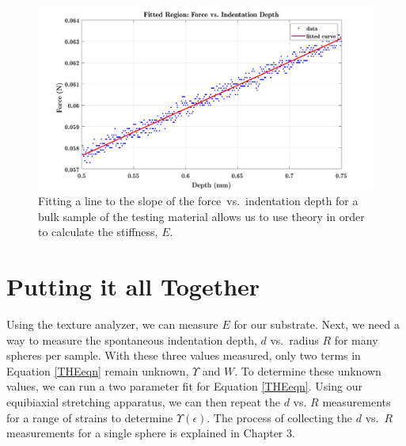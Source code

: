 \begin{figure}
	\centering
	\includegraphics[width=.9\linewidth]{Chapters/Figures/fittedRegionexample}
	\caption[Bulk stiffness Fit]{Fitting a line to the slope of the force~vs.~indentation depth for a bulk sample of the testing material allows us to use theory in order to calculate the stiffness, $E$.}
	\label{fig:fittedregionexample}
\end{figure}



\section{Putting it all Together}
Using the texture analyzer, we can measure $ E $ for our substrate. Next, we need a way to measure the spontaneous indentation depth, $ d $ vs.~radius $ R $ for many spheres per sample. With these three values measured, only two terms in Equation \ref{THEeqn} remain unknown, $ \Upsilon $ and $ W$. To determine these unknown values, we can run a two parameter fit for Equation \ref{THEeqn}. Using our equibiaxial stretching apparatus, we can then repeat the $ d $ vs. $ R $ measurements for a range of strains to determine $ \Upsilon(\epsilon) $. The process of collecting the $ d $ vs.~$ R $ measurements for a single sphere is explained in Chapter 3.

%